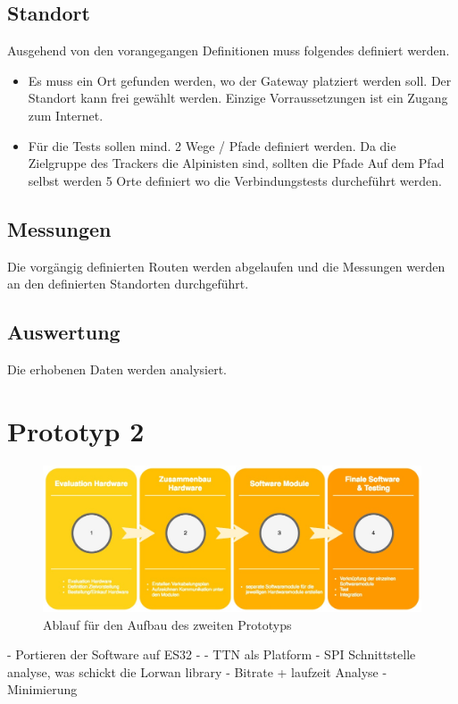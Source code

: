 \documentclass[11pt,english,german]{report}
\theoremstyle{definition}
\begin{document}
\subsection{Standort}
Ausgehend von den vorangegangen Definitionen muss folgendes definiert werden.
\begin{itemize}
	\item Es muss ein Ort gefunden werden, wo der Gateway platziert werden soll. Der Standort kann frei gewählt werden. Einzige Vorraussetzungen ist ein Zugang zum Internet.
	\item Für die Tests sollen mind. 2 Wege / Pfade definiert werden. Da die Zielgruppe des Trackers die Alpinisten sind, sollten die Pfade  Auf dem Pfad selbst werden 5 Orte definiert wo die Verbindungstests durcheführt werden.
\end{itemize}
	
\subsection{Messungen}
Die vorgängig definierten Routen werden abgelaufen und die Messungen werden an den definierten Standorten durchgeführt.

\subsection{Auswertung}
Die erhobenen Daten werden analysiert.

\newpage
\section{Prototyp 2}
\begin{figure}[h]
	\centering
	\includegraphics[width=\textwidth]{img/projectFlow_hardware.jpg}
	\caption[Flowchart Prototyp 2]
	{Ablauf für den Aufbau des zweiten Prototyps}
\end{figure}




- Portieren der Software auf ES32
- 
- TTN als Platform
- SPI Schnittstelle analyse, was schickt die Lorwan library
- Bitrate + laufzeit Analyse
- Minimierung 
\end{document}
